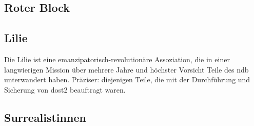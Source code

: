 \subsection{Roter Block}\label{ssec:roter_block}

\subsection{Lilie}\label{ssec:lilie}
Die Lilie ist eine emanzipatorisch-revolutionäre Assoziation, die in einer
langwierigen Mission über mehrere Jahre und höchster Vorsicht Teile des \ac{ndb}
unterwandert haben. Präziser: diejenigen Teile, die mit der Durchführung
und Sicherung von \ac{dost2} beauftragt waren.

\subsection{Surrealistinnen}\label{ssec:surrealisten}

